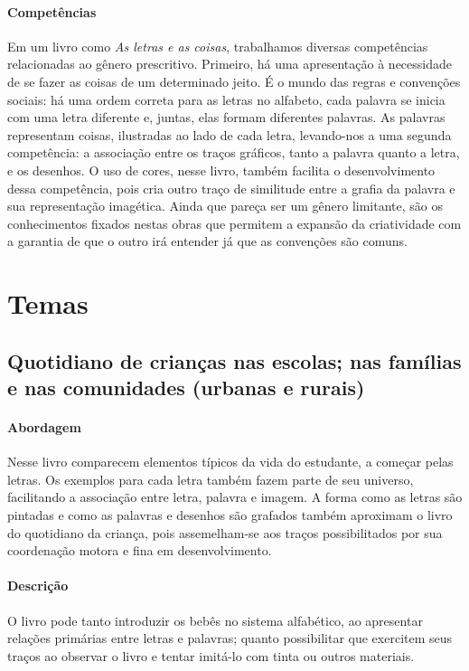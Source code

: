 \documentclass[11pt]{extarticle}
\begin{document}
\paragraph{Competências} Em um livro como
\emph{As letras e as coisas}, trabalhamos diversas competências relacionadas ao gênero prescritivo. 
Primeiro, há uma apresentação à necessidade de se fazer as coisas de um 
determinado jeito. É o mundo das regras e convenções sociais: há uma ordem correta para as letras no alfabeto, cada palavra se inicia com uma letra diferente e, juntas, elas formam diferentes palavras. As palavras representam coisas, ilustradas ao lado de cada letra, levando-nos a uma segunda competência: a associação entre os traços gráficos, tanto a palavra quanto a letra, e os desenhos. O uso de cores, nesse livro, também facilita o desenvolvimento dessa competência, pois cria outro traço de similitude entre a grafia da palavra e sua representação imagética. Ainda que pareça ser um gênero
limitante, são os conhecimentos fixados nestas obras que permitem a expansão
da criatividade com a garantia de que o outro irá entender já que as convenções são comuns.



\section{Temas}


\subsection{Quotidiano de crianças nas escolas; nas famílias e nas comunidades (urbanas e rurais)}

\paragraph{Abordagem} Nesse livro comparecem elementos típicos da vida do estudante, a começar pelas letras. Os exemplos para cada letra também fazem parte de seu universo, facilitando a associação entre letra, palavra e imagem. A forma como as letras são pintadas e como as palavras e desenhos são grafados também aproximam o livro do quotidiano da criança, pois assemelham-se aos traços possibilitados por sua coordenação motora e fina em desenvolvimento.

\paragraph{Descrição} O livro pode tanto introduzir os bebês no sistema alfabético, ao apresentar relações primárias entre letras e palavras; quanto possibilitar que exercitem seus traços ao observar o livro e tentar imitá-lo com tinta ou outros materiais.
\end{document}
